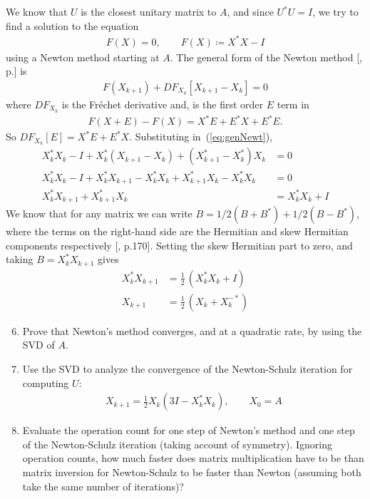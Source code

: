 \documentclass[10pt, A4paper]{article}
\begin{document}
We know that $U$ is the closest unitary matrix to $A$, and since 
$U^*U=I$, we try to find a solution to the equation
\begin{align}
	F(X) = 0,\qquad F(X)\coloneqq X^*X - I
\end{align}
using a Newton method starting at $A$.
The general form of the Newton method [\cite{Kell2003}, p.] is
\begin{align}
	F(X_{k+1}) + DF_{X_k} \left[X_{k+1} - X_k\right] = 0
	\label{eq:genNewt}
\end{align}
where $DF_{X_k}$ is the Fréchet derivative and, is the first order $E$ 
term in
\begin{align}
	F(X+E) - F(X) = X^*E + E^*X + E^*E.
\end{align}
So $DF_{X_k}[E] = X^*E + E^*X$. Substituting in~(\ref{eq:genNewt}),
\begin{align}
	X_k^*X_k - I + X_k^* \left( X_{k+1} - X_k \right) + 
		\left( X_{k+1}^* - X_k^* \right)X_k &= 0 \\
	X_k^*X_k - I + X_k^* X_{k+1} - X_k^* X_k + 
		X_{k+1}^* X_k - X_k^*  X_k &= 0 \\
	X_k^* X_{k+1} + X_{k+1}^*X_k &= X_k^* X_k + I
\end{align}
We know that for any matrix we can write $B = 1/2(B + B^*) + 
1/2(B-B^*)$, where the terms on the right-hand side are the Hermitian 
and skew Hermitian components respectively [\citealp{hojo1985}, p.170].
Setting the skew Hermitian part to zero, and taking $B = X_k^*X_{k+1}$ 
gives
\begin{align}
	X_k^*X_{k+1} &= \frac{1}{2} \, (X_k^*X_k + I) \\
	X_{k+1} &= \frac{1}{2} \, (X_k + X_k^{-*})
\end{align}

\begin{enumerate}
	\setcounter{enumi}{5}
	\item Prove that Newton's method converges, and at a quadratic
	rate, by using the SVD of $A$.
\end{enumerate}



\begin{enumerate}
	\setcounter{enumi}{6}
	\item Use the SVD to analyze the convergence of the
	Newton\nobreakdash-Schulz iteration for computing $U$:
	\begin{align*}
		X_{k+1} = \frac{1}{2}X_k(3I - X_k^* X_k), \qquad X_0 = A
	\end{align*}
\end{enumerate}



\begin{enumerate}
	\setcounter{enumi}{7}
	\item Evaluate the operation count for one step of Newton's 
	method and one step of the Newton\nobreakdash-Schulz iteration (taking
	account of symmetry). Ignoring operation counts, how much faster
	does matrix multiplication have to be than matrix inversion for
	Newton\nobreakdash-Schulz to be faster than Newton (assuming both take the same number of iterations)?
\end{enumerate}



\end{document}
